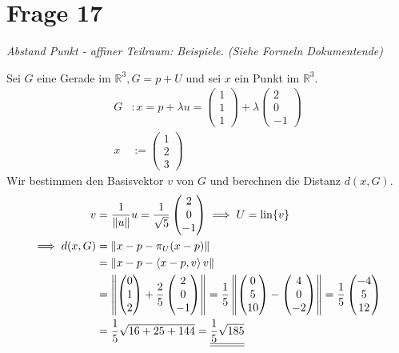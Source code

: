 \section{Frage 17}
\textit{Abstand Punkt - affiner Teilraum: Beispiele. (Siehe Formeln Dokumentende)}
\begin{example}
    Sei $G$ eine Gerade im $\mathbb{R}^3, G= p + U$ und sei $x$ ein Punkt im $\mathbb{R}^3$.
    \begin{align*}
        G &: x = p + \lambda u = \begin{pmatrix}
            1\\1\\1
        \end{pmatrix} + \lambda \begin{pmatrix}
            2\\0\\-1
        \end{pmatrix}\\
        x &:= \begin{pmatrix}
            1\\2\\3
        \end{pmatrix}
    \end{align*}
    Wir bestimmen den Basisvektor $v$ von $G$ und berechnen die Distanz $d(x,G)$.
    \begin{align*}
        v &= \frac{1}{\left\lVert u \right\rVert}u = \frac{1}{\sqrt{5}}\begin{pmatrix}
            2\\0\\-1
        \end{pmatrix} \implies U = \mathrm{lin}\{v\}\\
        \implies d(x,G) &= \left\lVert x-p-\pi_U(x-p) \right\rVert\\
        &= \left\lVert x -p - \left\langle x-p,v \right\rangle v \right\rVert\\
        &= \left\lVert \begin{pmatrix}
            0\\1\\2
        \end{pmatrix}+\frac{2}{5}\begin{pmatrix}
            2\\0\\-1
        \end{pmatrix} \right\rVert = \frac{1}{5}\left\lVert \begin{pmatrix}
            0\\5\\10
        \end{pmatrix} - \begin{pmatrix}
            4\\0\\-2
        \end{pmatrix} \right\rVert = \frac{1}{5}\begin{pmatrix}
            -4\\5\\12
        \end{pmatrix}\\
        &= \frac{1}{5}\sqrt{16 + 25 + 144} = \underline{\underline{\frac{1}{5}\sqrt{185}}}
    \end{align*}
\end{example}
